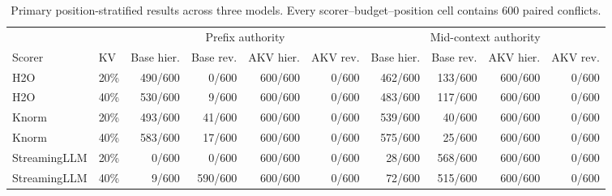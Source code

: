 \begin{table}[t]
\centering
\scriptsize
\setlength{\tabcolsep}{3.2pt}
\begin{tabular}{llrrrrrrrr}
\toprule
& & \multicolumn{4}{c}{Prefix authority} & \multicolumn{4}{c}{Mid-context authority} \\
\cmidrule(lr){3-6}\cmidrule(lr){7-10}
Scorer & KV & Base hier. & Base rev. & AKV hier. & AKV rev. & Base hier. & Base rev. & AKV hier. & AKV rev. \\
\midrule
H2O & 20\% & 490/600 & 0/600 & 600/600 & 0/600 & 462/600 & 133/600 & 600/600 & 0/600 \\
H2O & 40\% & 530/600 & 9/600 & 600/600 & 0/600 & 483/600 & 117/600 & 600/600 & 0/600 \\
\midrule
Knorm & 20\% & 493/600 & 41/600 & 600/600 & 0/600 & 539/600 & 40/600 & 600/600 & 0/600 \\
Knorm & 40\% & 583/600 & 17/600 & 600/600 & 0/600 & 575/600 & 25/600 & 600/600 & 0/600 \\
\midrule
StreamingLLM & 20\% & 0/600 & 0/600 & 600/600 & 0/600 & 28/600 & 568/600 & 600/600 & 0/600 \\
StreamingLLM & 40\% & 9/600 & 590/600 & 600/600 & 0/600 & 72/600 & 515/600 & 600/600 & 0/600 \\
\bottomrule
\end{tabular}
\caption{Primary position-stratified results across three models. Every scorer--budget--position cell contains 600 paired conflicts.}
\label{tab:position-full}
\end{table}
